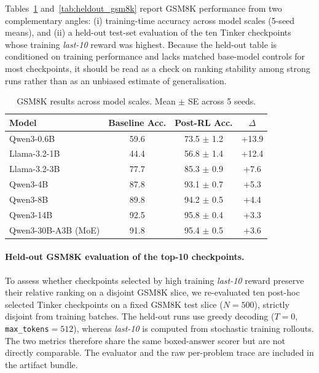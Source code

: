 \documentclass{article}
\begin{document}
Tables~\ref{tab:results_gsm8k} and~\ref{tab:heldout_gsm8k} report GSM8K
performance from two complementary angles: (i) training-time accuracy across
model scales (5-seed means), and (ii) a held-out test-set evaluation of the
ten Tinker checkpoints whose training \emph{last-10} reward was highest.
Because the held-out table is conditioned on training performance and lacks
matched base-model controls for most checkpoints, it should be read as a
check on ranking stability among strong runs rather than as an unbiased
estimate of generalisation.

\begin{table}[htbp]
\centering
\caption{GSM8K results across model scales. Mean $\pm$ SE across 5 seeds.}
\label{tab:results_gsm8k}
\begin{tabular}{lccc}
\toprule
\textbf{Model} & \textbf{Baseline Acc.} & \textbf{Post-RL Acc.} & \textbf{$\Delta$} \\
\midrule
Qwen3-0.6B & 59.6 & 73.5 $\pm$ 1.2 & +13.9 \\
Llama-3.2-1B & 44.4 & 56.8 $\pm$ 1.4 & +12.4 \\
Llama-3.2-3B & 77.7 & 85.3 $\pm$ 0.9 & +7.6 \\
Qwen3-4B & 87.8 & 93.1 $\pm$ 0.7 & +5.3 \\
Qwen3-8B & 89.8 & 94.2 $\pm$ 0.5 & +4.4 \\
Qwen3-14B & 92.5 & 95.8 $\pm$ 0.4 & +3.3 \\
Qwen3-30B-A3B (MoE) & 91.8 & 95.4 $\pm$ 0.5 & +3.6 \\
\bottomrule
\end{tabular}
\end{table}

\paragraph{Held-out GSM8K evaluation of the top-10 checkpoints.}
To assess whether checkpoints selected by high training \emph{last-10} reward
preserve their relative ranking on a disjoint GSM8K slice, we re-evaluated
ten post-hoc selected
Tinker checkpoints on a fixed GSM8K test slice ($N=500$), strictly disjoint
from training batches. The held-out runs use greedy decoding ($T{=}0$,
\texttt{max\_tokens}$=512$), whereas \emph{last-10} is computed from
stochastic training rollouts. The two metrics therefore share the same
boxed-answer scorer but are not directly comparable.
The evaluator and the raw per-problem trace are included in the artifact
bundle.
\end{document}
